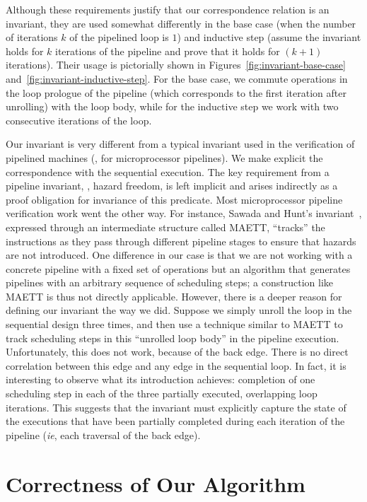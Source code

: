 Although these requirements justify that our correspondence
relation is an invariant, they are used somewhat differently
in the base case (when the number of iterations $k$ of the
pipelined loop is $1$) and inductive step (assume the
invariant holds for $k$ iterations of the pipeline and prove
that it holds for $(k+ 1)$ iterations).  Their usage is
pictorially shown in Figures~\ref{fig:invariant-base-case}
and~\ref{fig:invariant-inductive-step}.  For
the base case, we commute operations in the loop prologue of
the pipeline (which corresponds to the first iteration after
unrolling) with the loop body, while for the inductive step
we work with two consecutive iterations of the loop.

Our invariant is very different from a typical invariant
used in the verification of pipelined machines (\eg, for
microprocessor pipelines).  We make explicit the
correspondence with the sequential execution.  The key
requirement from a pipeline invariant, \viz, hazard freedom,
is left implicit and arises indirectly as a proof obligation
for invariance of this predicate.  Most microprocessor
pipeline verification work went the other way.  For
instance, Sawada and Hunt's invariant~\cite{sh:pipeline},
expressed through an intermediate structure called MAETT,
``tracks'' the instructions as they pass through different
pipeline stages to ensure that hazards are not introduced.
One difference in our case is that we are not working with a
concrete pipeline with a fixed set of operations but an
algorithm that generates pipelines with an arbitrary
sequence of scheduling steps; a construction like MAETT is
thus not directly applicable.  However, there is a deeper
reason for defining our invariant the way we did.
Suppose we simply unroll the loop in the sequential
design three times, and then use a technique similar to
MAETT to track scheduling steps in this ``unrolled loop
body'' in the pipeline execution.  Unfortunately, this does
not work, because of the back edge.  There is no direct
correlation between this edge and any edge in the sequential
loop.  In fact, it is interesting to observe what its
introduction achieves: completion of one scheduling step in
each of the three partially executed, overlapping loop
iterations.  This suggests that the invariant must
explicitly capture the state of the executions that have
been partially completed during each iteration of the
pipeline ({\em ie}, each traversal of the back edge).

\section{Correctness of Our Algorithm}

